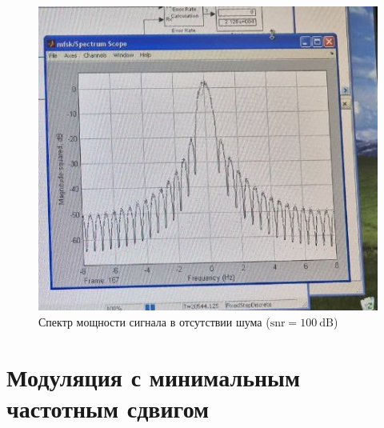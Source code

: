 \documentclass[14pt, a4paper]{article}
\begin{document}
\begin{figure}[H]
\centering
\includegraphics[width=.8\linewidth]{../images/rt2-9s}
\caption{Спектр мощности сигнала в отсутствии шума ($\text{snr}=100\ \text{dB}$)}
\end{figure}

\section{Модуляция с минимальным частотным сдвигом}
\end{document}
